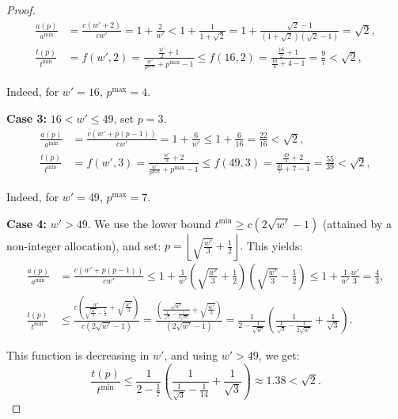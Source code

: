 \documentclass{article}
\begin{document}
\begin{proof}
\begin{align*}
\frac{a(p)}{a^{\min}} &=\frac{c(w'+2)}{cw'}=1+\frac{2}{w'} < 1+\frac{1}{1+\sqrt{2}}=1+\frac{\sqrt{2}-1}{(1+\sqrt{2})(\sqrt{2}-1)}=\sqrt{2}, \\[6pt]
\frac{t(p)}{t^{\min}}
      &= f(w',2)
       = \frac{\tfrac{w'}{2} + 1}{\tfrac{w'}{p^{\max}} + p^{\max} - 1}
       \le f(16,2)
       = \frac{\tfrac{16}{2} + 1}{\tfrac{16}{4} + 4 - 1}
       = \frac{9}{7}
       < \sqrt{2},
\end{align*}

Indeed, for \(w' = 16\), \(p^{\max}=4\).

\textbf{Case 3:} \(16 < w' \le 49\), set \(p = 3\).
\begin{align*}
\frac{a(p)}{a^{\min}}
      &= \frac{c\!\left(w' + p(p-1)\right)}{c w'}
       = 1 + \frac{6}{w'}
       \le 1 + \frac{6}{16}
       = \frac{22}{16}
       < \sqrt{2}, \\[6pt]
\frac{t(p)}{t^{\min}}
      &= f(w',3)
       = \frac{\tfrac{w'}{3} + 2}{\tfrac{w'}{p^{\max}} + p^{\max} - 1}
       \le f(49,3)
       = \frac{\tfrac{49}{3} + 2}{\tfrac{49}{7} + 7 - 1}
       = \frac{55}{39}
       < \sqrt{2},
\end{align*}

Indeed, for \(w' = 49\), \(p^{\max}=7\).


\textbf{Case 4:} \(w' > 49\).  
We use the lower bound \(t^{\min} \ge c(2\sqrt{w'} - 1)\) (attained by a non-integer allocation), and set:
\(
p = \left\lfloor \sqrt{\frac{w'}{3}} + \frac{1}{2} \right\rfloor.
\)
This yields:
\begin{align*}
\frac{a(p)}{a^{\min}}&=\frac{c(w'+p(p-1))}{cw'}\leq 1+\frac{1}{w'}\left( \sqrt{\frac{w'}{3}}+\frac{1}{2}\right)\left(\sqrt{\frac{w'}{3}}-\frac{1}{2}\right)\leq 1+\frac{1}{w'}\frac{w'}{3} = \frac{4}{3}, \\[6pt]
\frac{t(p)}{t^{\min}} &\leq \frac{c\left(\frac{w'}{\sqrt{\frac{w'}{3}}-\frac{1}{2}} +\sqrt{\frac{w'}{3}}\right)}{c(2\sqrt{w'}-1)}= \frac{\left(\frac{\sqrt{w'}}{\frac{1}{\sqrt{3}}-\frac{1}{2\sqrt{w'}}} +\sqrt{\frac{w'}{3}}\right)}{(2\sqrt{w'}-1)}=\frac{1}{2-\frac{1}{\sqrt{w'}}}\left(\frac{1}{\frac{1}{\sqrt{3}}-\frac{1}{2\sqrt{w'}}} +\frac{1}{\sqrt{3}}\right).
\end{align*}

This function is decreasing in \(w'\), and using \(w' > 49\), we get:
\[
\frac{t(p)}{t^{\min}} \le \frac{1}{2 - \frac{1}{7}} \left( \frac{1}{\frac{1}{\sqrt{3}} - \frac{1}{14}} + \frac{1}{\sqrt{3}} \right) \approx 1.38 < \sqrt{2}.
\]



\end{proof}
\end{document}
